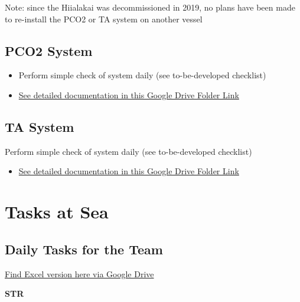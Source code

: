 \documentclass[]{book}
\providecommand{\tightlist}{%
  \setlength{\itemsep}{0pt}\setlength{\parskip}{0pt}}
\begin{document}
Note: since the Hiialakai was decommissioned in 2019, no plans have been made to re-install the PCO2 or TA system on another vessel

\hypertarget{pco2-system}{%
\section{PCO2 System}\label{pco2-system}}

\begin{itemize}
\tightlist
\item
  Perform simple check of system daily (see to-be-developed checklist)
\item
  \href{https://drive.google.com/drive/folders/1p-Evjb3zrw4Kk460knsl4rI4m2Un_jyy}{See detailed documentation in this Google Drive Folder Link}
\end{itemize}

\hypertarget{ta-system}{%
\section{TA System}\label{ta-system}}

Perform simple check of system daily (see to-be-developed checklist)

\begin{itemize}
\tightlist
\item
  \href{https://drive.google.com/drive/folders/1p-Evjb3zrw4Kk460knsl4rI4m2Un_jyy}{See detailed documentation in this Google Drive Folder Link}
\end{itemize}

\hypertarget{tasks}{%
\chapter{Tasks at Sea}\label{tasks}}

\hypertarget{daily-tasks-for-the-team}{%
\section{Daily Tasks for the Team}\label{daily-tasks-for-the-team}}

\href{https://drive.google.com/open?id=1I4Hojo0qjKtUwhRqgc9aLM6_fGtjqZMM}{Find Excel version here via Google Drive}

\textbf{STR}
\end{document}
